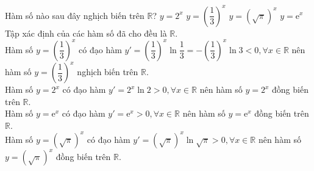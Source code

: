 \begin{ex}%
 Hàm số nào sau đây nghịch biến trên $\mathbb{R}$?
 \choice
  {$y = 2^x$}
  {\True $y = \left( \dfrac{1}{3} \right)^x$}
  {$y = \left( \sqrt{\pi} \right)^x$}
  {$y = \mathrm{e}^x$}
 \loigiai
  {
  Tập xác định của các hàm số đã cho đều là $\mathbb{R}$.\\
  Hàm số $y = \left( \dfrac{1}{3} \right)^x$ có đạo hàm $y' = \left( \dfrac{1}{3} \right)^x \ln \dfrac{1}{3} = - \left( \dfrac{1}{3} \right)^x \ln 3 < 0, \forall x \in \mathbb{R}$ nên hàm số $y = \left( \dfrac{1}{3} \right)^x$ nghịch biến trên $\mathbb{R}$.\\
  Hàm số $y = 2^x$ có đạo hàm $y' = 2^x \ln 2 > 0, \forall x \in \mathbb{R}$ nên hàm số $y = 2^x$ đồng biến trên $\mathbb{R}$.\\
  Hàm số $y = \mathrm{e}^x$ có đạo hàm $y' = \mathrm{e}^x > 0, \forall x \in \mathbb{R}$ nên hàm số $y = \mathrm{e}^x$ đồng biến trên $\mathbb{R}$.\\
  Hàm số $y = \left( \sqrt{\pi} \right)^x$ có đạo hàm $y' = \left( \sqrt{\pi} \right)^x \ln \sqrt{\pi} > 0, \forall x \in \mathbb{R}$ nên hàm số $y = \left( \sqrt{\pi} \right)^x$ đồng biến trên $\mathbb{R}$.
  }
\end{ex}


